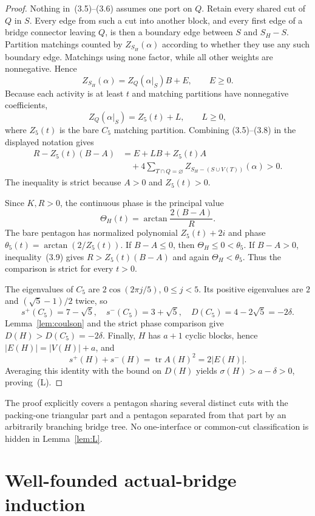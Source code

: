 \documentclass[11pt]{article}
\theoremstyle{remark}
\newcommand{\splus}{s^+}
\newcommand{\sminus}{s^-}
\newcommand{\sig}{\sigma}
\newcommand{\D}{D}
\newcommand{\tr}{\operatorname{tr}}
\begin{document}
\begin{proof}
Nothing in~(3.5)--(3.6) assumes one port on $Q$.  Retain every shared cut of
$Q$ in $S$.  Every edge from such a cut into another block, and every first
edge of a bridge connector leaving $Q$, is then a boundary edge between $S$
and $S_H-S$.  Partition matchings counted by $Z_{S_H}(\alpha)$ according to
whether they use any such boundary edge.  Matchings using none factor, while
all other weights are nonnegative.  Hence
\[
 Z_{S_H}(\alpha)=Z_Q(\alpha|_S)B+E,\qquad E\geq0.          \tag{3.7}
\]
Because each activity is at least $t$ and matching partitions have
nonnegative coefficients,
\[
 Z_Q(\alpha|_S)=Z_5(t)+L,\qquad L\geq0,                   \tag{3.8}
\]
where $Z_5(t)$ is the bare $C_5$ matching partition.  Combining
(3.5)--(3.8) in the displayed notation gives
\begin{align*}
 R-Z_5(t)(B-A)
 &=E+LB+Z_5(t)A\\
 &\quad+4\sum_{T\cap Q=\varnothing}
       Z_{S_H-(S\cup V(T))}(\alpha)>0.                   \tag{3.9}
\end{align*}
The inequality is strict because $A>0$ and $Z_5(t)>0$.

Since $K,R>0$, the continuous phase is the principal value
\[
 \Theta_H(t)=\arctan\frac{2(B-A)}R.
\]
The bare pentagon has normalized polynomial $Z_5(t)+2i$ and phase
$\theta_5(t)=\arctan(2/Z_5(t))$.  If $B-A\leq0$, then
$\Theta_H\leq0<\theta_5$.  If $B-A>0$, inequality~(3.9) gives
$R>Z_5(t)(B-A)$ and again $\Theta_H<\theta_5$.  Thus the comparison is strict
for every $t>0$.

The eigenvalues of $C_5$ are $2\cos(2\pi j/5)$, $0\leq j<5$.  Its positive
eigenvalues are $2$ and $(\sqrt5-1)/2$ twice, so
\[
 \splus(C_5)=7-\sqrt5,
 \quad \sminus(C_5)=3+\sqrt5,
 \quad \D(C_5)=4-2\sqrt5=-2\delta.                       \tag{3.10}
\]
Lemma~\ref{lem:coulson} and the strict phase comparison give
$\D(H)>\D(C_5)=-2\delta$.  Finally, $H$ has $a+1$ cyclic blocks, hence
$|E(H)|=|V(H)|+a$, and
\[
 \splus(H)+\sminus(H)=\tr A(H)^2=2|E(H)|.
\]
Averaging this identity with the bound on $\D(H)$ yields
$\sig(H)>a-\delta>0$, proving~(L).
\end{proof}

The proof explicitly covers a pentagon sharing several distinct cuts with the
packing-one triangular part and a pentagon separated from that part by an
arbitrarily branching bridge tree.  No one-interface or common-cut
classification is hidden in Lemma~\ref{lem:L}.

\section{Well-founded actual-bridge induction}\label{sec:bridges}
\end{document}
